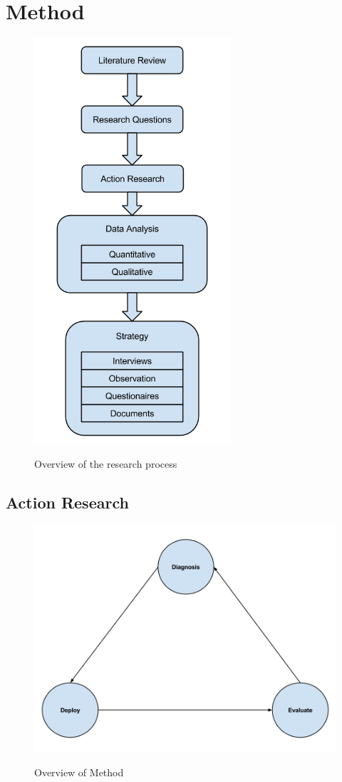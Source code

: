 \chapter{Method}

\begin{figure}
\centering
\includegraphics[height=15cm, natwidth=421, natheight=869]{empirical/method/images/overviewOfResearchProcess.png}
\label{oorp}
\caption{Overview of the research process}
\end{figure}

\section{Action Research}
\begin{figure}
\includegraphics[width=13cm, natwidth=960, natheight=770]{empirical/method/images/overOrdnetActionMethod.png}
\centering
\label{ooam}
\caption{Overview of Method}
\end{figure}

